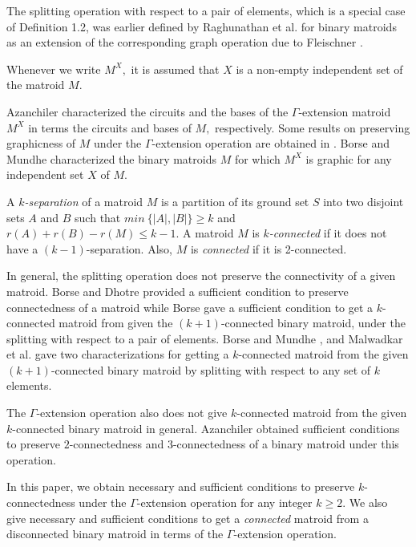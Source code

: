 \documentclass[
11pt,%
tightenlines,%
twoside,%
onecolumn,%
nofloats,%
nobibnotes,%
nofootinbib,%
superscriptaddress,%
noshowpacs,%
centertags]%
{revtex4}
\begin{document}
The splitting operation with respect to a pair of elements, which is
a special case of Definition 1.2, was earlier defined by Raghunathan et al. \cite{rsw}
 for binary matroids as an extension of the corresponding graph operation due to Fleischner \cite{f}.

Whenever we write $M^{X},$ it is assumed that $X$ is a non-empty independent set of  the matroid $M.$

Azanchiler \cite{a1} characterized the circuits and the bases of the  $\Gamma$-extension
 matroid $M^{X}$ in terms the circuits and bases of $M,$ respectively. Some results on preserving graphicness of  $M$ under the $\Gamma$-extension operation are obtained in \cite{a2}. Borse and Mundhe \cite{bm2} characterized the binary matroids $M$ for which $M^X$ is graphic for any independent set $X$ of $M.$


A {\it $k$-separation} of a matroid $M$  is a partition of its ground set $S$ into two
 disjoint sets $A$ and $B$ such that  $min~\{\left| A \right|,\left| B \right| \} \geq k$ and $ r(A)+r(B)-r(M)\leq k-1.$  A matroid $M$ is {\it $k$-connected} if it does not have a $(k-1)$-separation. Also,  $M$ is  {\it connected} if it is  2-connected.

In general, the splitting operation does not preserve the connectivity
 of a given matroid. Borse and Dhotre \cite{bd} provided a sufficient condition to preserve
  connectedness of a matroid   while Borse \cite{b} gave a sufficient condition to get a
   $k$-connected matroid from given the $(k+1)$-connected binary matroid, under the splitting
   with respect to a pair of elements. Borse and Mundhe \cite{bm1}, and Malwadkar et al. \cite{msd}
    gave two characterizations for getting a $k$-connected  matroid from the given $(k+1)$-connected
    binary matroid by splitting with respect to any set of $k$ elements.


 The $\Gamma$-extension operation also does not give $k$-connected matroid
 from the given $k$-connected binary matroid in general. Azanchiler \cite{a1} obtained
 sufficient conditions to preserve $2$-connectedness and 3-connectedness  of a binary matroid under this operation.

In this paper, we obtain  necessary and sufficient conditions to preserve $k$-connectedness  under  the
  $\Gamma$-extension operation for any integer $ k \geq 2.$  We also give necessary and sufficient conditions
  to get a \textit{connected}  matroid  from a disconnected binary matroid  in terms of the  $\Gamma$-extension
   operation.
\end{document}

